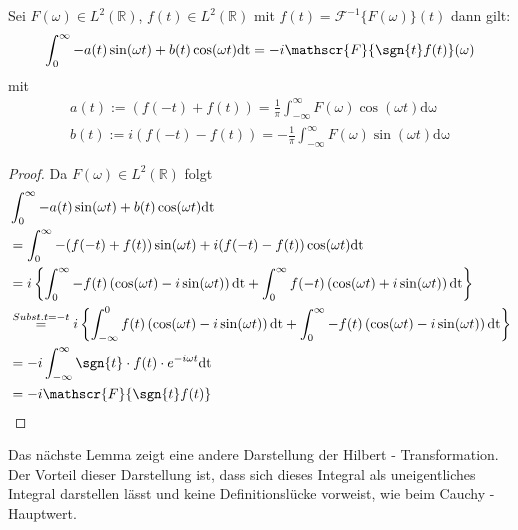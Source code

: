 \begin{lemma}\label{ht:sgnFou}
Sei $F(\omega) \in L^2(\mathbb{R})$, $f(t) \in L^2(\mathbb{R})$ mit $f(t) = \mathscr{F}^{-1}\{F(\omega)\}(t) $ dann gilt:  
\begin{align}
	\int_0^{\infty} -a(t) \sin(\omega t) + b(t) \cos(\omega t) \mathrm{dt} = -i \mathscr{F}\{\sgn{t} f(t)\}(\omega)
\end{align} 
mit 
\begin{align}
	a(t) := (f(-t) + f(t))  = \frac{1}{\pi} \int_{-\infty}^{\infty} F(\omega) \cos(\omega t) \mathrm{d\omega} \\
	b(t) := i (f(-t) - f(t)) = -\frac{1}{\pi} \int_{-\infty}^{\infty} F(\omega) \sin(\omega t) \mathrm{d\omega}
\end{align}
\begin{proof}
Da $F(\omega) \in L^2(\mathbb{R})$  folgt 
\begin{align}
&\int_0^{\infty} -a(t) \sin(\omega t) + b(t) \cos(\omega t) \mathrm{dt} \\
&= \int_0^{\infty} -(f(-t) + f(t)) \sin(\omega t) + i (f(-t) - f(t)) \cos(\omega t) \mathrm{dt} \\
&= i \left\{ \int_0^{\infty} -f(t) \left(\cos(\omega t) - i \sin(\omega t) \right)  \mathrm{dt} + \int_0^{\infty} f(-t) \left(\cos(\omega t) + i \sin(\omega t) \right)  \mathrm{dt} \right\}\\
&\stackrel{Subst. t = -t}{=} i \left\{ \int_{-\infty}^{0} f(t) \left(\cos(\omega t) - i \sin(\omega t) \right)  \mathrm{dt} +  \int_0^{\infty} -f(t) \left(\cos(\omega t) - i \sin(\omega t) \right)  \mathrm{dt} \right\}\\
&= - i \int_{-\infty}^{\infty} \sgn{t} \cdot  f(t) \cdot  e^{- i \omega t}  \mathrm{dt}\\
&= - i \mathscr{F}\{\sgn{t} f(t)\}
\end{align}
\end{proof}
\end{lemma}
Das nächste Lemma zeigt eine andere Darstellung der Hilbert - Transformation. Der Vorteil dieser Darstellung ist, dass sich dieses Integral als uneigentliches Integral darstellen lässt und keine Definitionslücke vorweist, wie beim Cauchy - Hauptwert.
